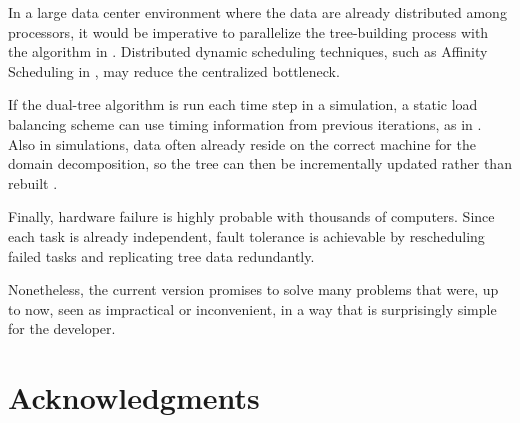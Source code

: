 \documentclass[twoside,leqno,twocolumn]{article}
\begin{document}
In a large data center environment where the data are already distributed among processors, it would be imperative to parallelize the tree-building process with the algorithm in \cite{alfuraih00parallel}.
Distributed dynamic scheduling techniques, such as Affinity Scheduling in \cite{markatos92using}, may reduce the centralized bottleneck.

If the dual-tree algorithm is run each time step in a simulation, a static load balancing scheme can use timing information from previous iterations, as in \cite{liu94experiences, salmon_thesis, singh_thesis}.
Also in simulations, data often already reside on the correct machine for the domain decomposition, so the tree can then be incrementally updated rather than rebuilt \cite{liu94experiences}.

Finally, hardware failure is highly probable with thousands of computers.
Since each task is already independent, fault tolerance is achievable by rescheduling failed tasks and replicating tree data redundantly.

Nonetheless, the current version promises to solve many problems that were, up to now, seen as impractical or inconvenient, in a way that is surprisingly simple for the developer.

\section{Acknowledgments}
\end{document}
